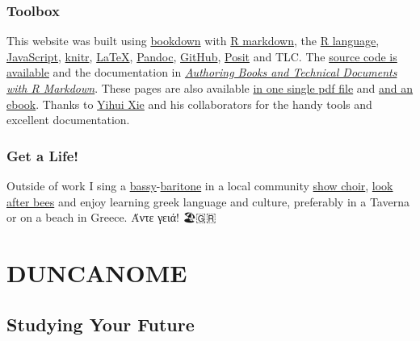 \documentclass[
  12pt,
]{book}
\begin{document}
\hypertarget{toolbox}{%
\section*{Toolbox}\label{toolbox}}

This website was built using \href{https://bookdown.org}{bookdown} with \href{https://en.wikipedia.org/wiki/Markdown}{R markdown}, the \href{https://en.wikipedia.org/wiki/R_(programming_language)}{R language}, \href{https://en.wikipedia.org/wiki/JavaScript}{JavaScript}, \href{https://en.wikipedia.org/wiki/Knitr}{knitr}, \href{https://latex4year1.netlify.app}{LaTeX}, \href{https://en.wikipedia.org/wiki/Pandoc}{Pandoc}, \href{https://en.wikipedia.org/wiki/GitHub}{GitHub}, \href{https://posit.co/}{Posit} and TLC. The \href{https://github.com/dullhunk/duncanome}{source code is available} and the documentation in \emph{\href{https://bookdown.org/yihui/bookdown/}{Authoring Books and Technical Documents with R Markdown}}. These pages are also available \href{https://personalpages.manchester.ac.uk/staff/duncan.hull/duncan-hull.pdf}{in one single pdf file} and \href{https://personalpages.manchester.ac.uk/staff/duncan.hull/duncan-hull.epub}{and an ebook}. Thanks to \href{https://en.wikipedia.org/wiki/Yihui_Xie}{Yihui Xie} and his collaborators for the handy tools and excellent documentation. 🙏

\hypertarget{get-a-life}{%
\section*{Get a Life!}\label{get-a-life}}

Outside of work I sing a \href{https://en.wikipedia.org/wiki/Bass_(voice_type)}{bassy}-\href{https://en.wikipedia.org/wiki/Baritone}{baritone} in a local community \href{https://en.wikipedia.org/wiki/Show_choir}{show choir}, \href{http://beelife.cs.manchester.ac.uk/}{look after bees} and enjoy learning greek language and culture, preferably in a Taverna or on a beach in Greece. Άντε γειά! 🏖️🇬🇷

\hypertarget{part-duncanome}{%
\part{DUNCANOME}\label{part-duncanome}}

\hypertarget{teaching}{%
\chapter{Studying Your Future}\label{teaching}}
\end{document}
